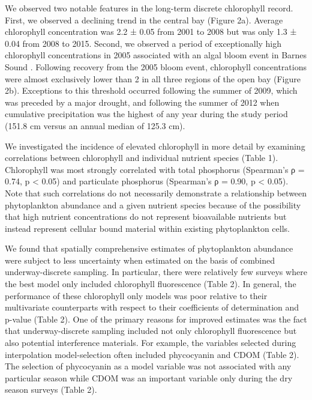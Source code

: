 \documentclass[review]{elsarticle}
\begin{document}
We observed two notable features in the long-term discrete chlorophyll record. First, we observed a declining trend in the central bay (Figure 2a). Average chlorophyll concentration was 2.2 ± 0.05 from 2001 to 2008 but was only 1.3 ± 0.04 from 2008 to 2015. Second, we observed a period of exceptionally high chlorophyll concentrations in 2005 associated with an algal bloom event in Barnes Sound \citep{rudnick_2006}. Following recovery from the 2005 bloom event, chlorophyll concentrations were almost exclusively lower than 2 in all three regions of the open bay (Figure 2b). Exceptions to this threshold occurred following the summer of 2009, which was preceded by a major drought, and following the summer of 2012 when cumulative precipitation was the highest of any year during the study period (151.8 cm versus an annual median of 125.3 cm).

We investigated the incidence of elevated chlorophyll in more detail by examining correlations between chlorophyll and individual nutrient species (Table 1). Chlorophyll was most strongly correlated with total phosphorus (Spearman’s ρ = 0.74, p < 0.05) and particulate phosphorus (Spearman’s ρ = 0.90, p < 0.05). Note that such correlations do not necessarily demonstrate a relationship between phytoplankton abundance and a given nutrient species because of the possibility that high nutrient concentrations do not represent bioavailable nutrients but instead represent cellular bound material within existing phytoplankton cells.  

We found that spatially comprehensive estimates of phytoplankton abundance were subject to less uncertainty when estimated on the basis of combined underway-discrete sampling. In particular, there were relatively few surveys where the best model only included chlorophyll fluorescence (Table 2). In general, the performance of these chlorophyll only models was poor relative to their multivariate counterparts with respect to their coefficients of determination and p-value (Table 2). One of the primary reasons for improved estimates was the fact that underway-discrete sampling included not only chlorophyll fluorescence but also potential interference materials. For example, the variables selected during interpolation model-selection often included phycocyanin and CDOM (Table 2). The selection of phycocyanin as a model variable was not associated with any particular season while CDOM was an important variable only during the dry season surveys (Table 2). 
\end{document}
